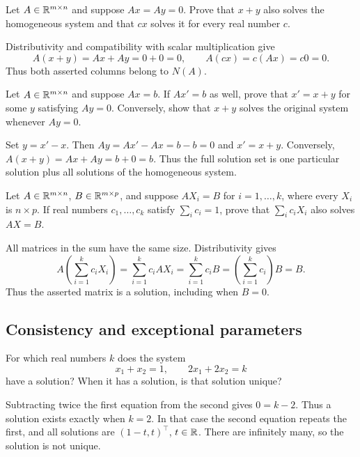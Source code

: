 \begin{problem}\label{ex:01:combining-homogeneous-solutions}
Let $A\in\mathbb R^{m\times n}$ and suppose $Ax=Ay=0$.
Prove that $x+y$ also solves the homogeneous system and that $cx$
solves it for every real number $c$.
\end{problem}
\begin{solution}
Distributivity and compatibility with scalar multiplication give
\[
A(x+y)=Ax+Ay=0+0=0,
\qquad
A(cx)=c(Ax)=c0=0.
\]
Thus both asserted columns belong to $N(A)$.
\end{solution}

\begin{problem}\label{ex:01:translated-solutions}
Let $A\in\mathbb R^{m\times n}$ and suppose $Ax=b$.
If $Ax'=b$ as well, prove that $x'=x+y$ for some $y$ satisfying $Ay=0$.
Conversely, show that $x+y$ solves the original system whenever $Ay=0$.
\end{problem}
\begin{solution}
Set $y=x'-x$. Then $Ay=Ax'-Ax=b-b=0$ and $x'=x+y$.
Conversely, $A(x+y)=Ax+Ay=b+0=b$. Thus the full solution set is
one particular solution plus all solutions of the homogeneous system.
\end{solution}

\begin{problem}\label{ex:01:affine-combinations-of-solutions}
Let $A\in\mathbb R^{m\times n}$, $B\in\mathbb R^{m\times p}$, and suppose
$AX_i=B$ for $i=1,\ldots,k$, where every $X_i$ is $n\times p$.
If real numbers $c_1,\ldots,c_k$ satisfy $\sum_i c_i=1$, prove that
$\sum_i c_iX_i$ also solves $AX=B$.
\end{problem}
\begin{solution}
All matrices in the sum have the same size. Distributivity gives
\[
A\left(\sum_{i=1}^k c_iX_i\right)
=\sum_{i=1}^k c_iAX_i
=\sum_{i=1}^k c_iB
=\left(\sum_{i=1}^k c_i\right)B=B.
\]
Thus the asserted matrix is a solution, including when $B=0$.
\end{solution}

\subsection*{Consistency and exceptional parameters}

\begin{problem}\label{ex:01:dependent-equations-parameter}
For which real numbers $k$ does the system
\[
x_1+x_2=1,\qquad 2x_1+2x_2=k
\]
have a solution? When it has a solution, is that solution unique?
\end{problem}
\begin{solution}
Subtracting twice the first equation from the second gives $0=k-2$.
Thus a solution exists exactly when $k=2$. In that case the second
equation repeats the first, and all solutions are $(1-t,t)^\top$, $t\in\mathbb R$.
There are infinitely many, so the solution is not unique.
\end{solution}

